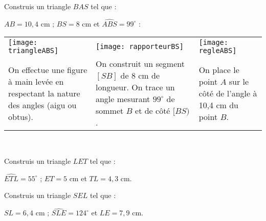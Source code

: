 \begin{methode*1}

 \begin{exemple*1}
Construis un triangle $BAS$ tel que :

$AB = 10,4$ cm ; $BS = 8$ cm et $\widehat{ABS} = 99^\circ$ : \\[1em]
\begin{tabularx}{\textwidth}{X|X|X}
 \texttt{[image: triangleABS]} &  \texttt{[image: rapporteurBS]} & \texttt{[image: regleABS]} \\ 
 On effectue une figure à main levée en respectant la nature des angles (aigu ou obtus). & On construit un segment $[SB]$ de 8 cm de longueur. On trace un angle mesurant $99^\circ$ de sommet $B$ et de côté $[BS)$. & On place le point $A$ sur le côté de l'angle à 10,4 cm du point $B$. \\
\end{tabularx} \\

\end{exemple*1}

\exercice
Construis un triangle $LET$ tel que :

$\widehat{ETL} = 55^\circ$ ; $ET = 5$ cm et $TL = 4,3$ cm.
\vspace{4cm}

\exercice
Construis un triangle $SEL$ tel que :

$SL = 6,4$ cm ; $\widehat{SLE}= 124^\circ$ et $LE = 7,9$ cm.
\vspace{2cm}
 
\end{methode*1}



